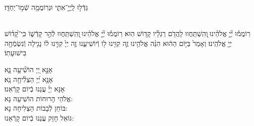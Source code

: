 \documentclass[twoside, openany, parskip=half, 11pt]{book}
\begin{document}
\begin{sometimes}
\shatz
גַּדְּֿל֣וּ לַֽיְיָ֣־אִתִּ֑י וּנְרֽוֹמֲמָ֖ה שְֿׁמ֣וֹ־יַחְדָּֽו׃

\\
רֽוֹמֲמ֡וּ יְ֘יָ֤ אֱלֹהֵ֗ינוּ ֖וְהִֽשְׁתַּֽחֲווּ לַֽהֲדֹ֥ם רַגְלָ֗יו קָד֥וֹשׁ הֽוּא׃
רֽוֹמֲמ֡וּ יְ֘יָ֤ אֱלֹהֵ֗ינוּ ֖וְהִֽשְׁתַּֽחֲווּ לְֿהַ֣ר קָדְֿשׁ֑וֹ כִּֽי־קָ֝ד֗וֹשׁ יְיָ֥ אֱלֹהֵֽינוּ׃
וְאָמַר֙ בַּיּ֣וֹם הַה֔וּא הִנֵּ֨ה אֱלֹהֵ֥ינוּ זֶ֛ה קִוִּ֥ינוּ ל֖וֹ וְֿיוֹשִׁיעֵ֑נוּ זֶ֤ה יְיָ֙ קִוִּ֣ינוּ ל֔וֹ נָגִ֥ילָה וְֿנִשְׂמְֿחָ֖ה בִּישׁוּעָתֽוֹ׃



אָנָּ֣א יְ֭יָ הוֹשִׁ֘יעָ֥ה נָּ֑א\\
 אָנָּ֥א יְ֝יָ הַצְלִ֘יחָ֥ה נָּֽא׃\\
 אָנָּא יְיָ֗ עֲנֵנוּ בְֿיוֹם קָרְֿאֵנוּ׃\\

 אֱלֹהֵי הָרוּחוֹת הוֹשִׁיעָה נָּא:\\ בּוֹחֵן לְֿבָבוֹת הַצְלִיחָה נָא:\\ גּוֹאֵל חָזָק עֲנֵנוּ בְֿיוֹם קָרְֿאֵנוּ:




\end{sometimes}
\end{document}
